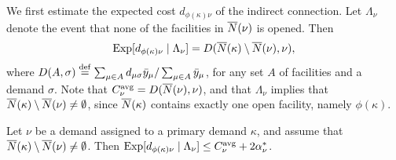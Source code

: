 We first estimate the expected cost $d_{\phi(\kappa)\nu}$ of the indirect
connection. Let $\Lambda_\nu$ denote the event that none of the
facilities in ${\overline{N}}(\nu)$ is opened. Then
%
\begin{equation}
	\mbox{\rm Exp}[ d_{\phi(\kappa)\nu} \mid \Lambda_\nu] 
			= D({\overline{N}}(\kappa) \setminus {\overline{N}}(\nu), \nu),
			\label{eqn: expected indirect connection}
\end{equation}
%
where $D(A,\sigma) \stackrel{\mathrm{def}}{=}\sum_{\mu\in A}
d_{\mu\sigma}{\bar y}_{\mu}/\sum_{\mu\in A} {\bar y}_{\mu}$, for
any set $A$ of facilities and a demand $\sigma$.  Note that
$C^{{\mbox{\scriptsize\rm avg}}}_\nu = D({\overline{N}}(\nu),\nu)$, and that $\Lambda_\nu$
implies that ${\overline{N}}(\kappa) \setminus
{\overline{N}}(\nu)\neq\emptyset$, since ${\overline{N}}(\kappa)$ contains
exactly one open facility, namely $\phi(\kappa)$.


\begin{lemma}
  \label{lem:echu indirect}
  Let $\nu$ be a demand assigned to a primary demand $\kappa$, and
assume that ${\overline{N}}(\kappa) \setminus {\overline{N}}(\nu)\neq\emptyset$.
Then $\mbox{\rm Exp}[ d_{\phi(\kappa)\nu} \mid \Lambda_\nu]  \leq
  		C^{{\mbox{\scriptsize\rm avg}}}_\nu+2\alpha_{\nu}^\ast$.
\end{lemma}

